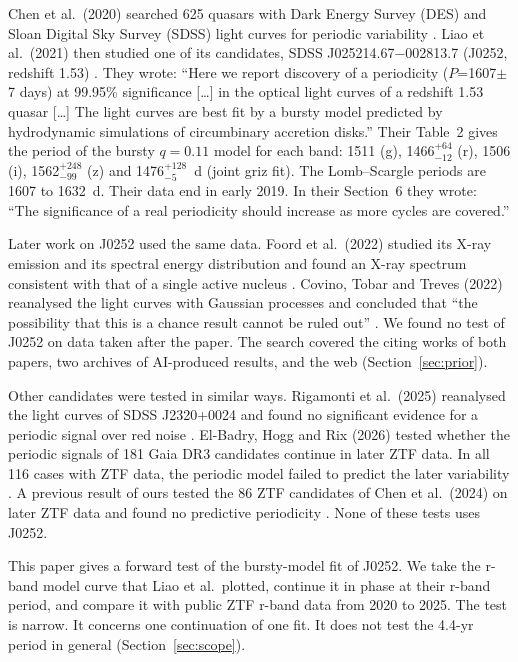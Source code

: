 \documentclass[11pt]{article}
\begin{document}
Chen et al.\ (2020) searched 625 quasars with Dark Energy Survey (DES) and Sloan Digital Sky Survey (SDSS) light curves for periodic variability \cite{chen2020}. Liao et al.\ (2021) then studied one of its candidates, SDSS J025214.67$-$002813.7 (J0252, redshift 1.53) \cite{liao2021}. They wrote: ``Here we report discovery of a periodicity ($P$=1607$\pm$7 days) at 99.95\% significance [\dots] in the optical light curves of a redshift 1.53 quasar [\dots] The light curves are best fit by a bursty model predicted by hydrodynamic simulations of circumbinary accretion disks.'' Their Table~2 gives the period of the bursty $q=0.11$ model for each band: 1511 (g), 1466$^{+64}_{-12}$ (r), 1506 (i), 1562$^{+248}_{-99}$ (z) and 1476$^{+128}_{-5}$~d (joint griz fit). The Lomb--Scargle periods are 1607 to 1632~d. Their data end in early 2019. In their Section~6 they wrote: ``The significance of a real periodicity should increase as more cycles are covered.''

Later work on J0252 used the same data. Foord et al.\ (2022) studied its X-ray emission and its spectral energy distribution and found an X-ray spectrum consistent with that of a single active nucleus \cite{foord2022}. Covino, Tobar and Treves (2022) reanalysed the light curves with Gaussian processes and concluded that ``the possibility that this is a chance result cannot be ruled out'' \cite{covino2022}. We found no test of J0252 on data taken after the paper. The search covered the citing works of both papers, two archives of AI-produced results, and the web (Section~\ref{sec:prior}).

Other candidates were tested in similar ways. Rigamonti et al.\ (2025) reanalysed the light curves of SDSS J2320+0024 and found no significant evidence for a periodic signal over red noise \cite{rigamonti2025}. El-Badry, Hogg and Rix (2026) tested whether the periodic signals of 181 Gaia DR3 candidates continue in later ZTF data. In all 116 cases with ZTF data, the periodic model failed to predict the later variability \cite{elbadry2026}. A previous result of ours tested the 86 ZTF candidates of Chen et al.\ (2024) \cite{chen2024} on later ZTF data and found no predictive periodicity \cite{wu2026}. None of these tests uses J0252.

This paper gives a forward test of the bursty-model fit of J0252. We take the r-band model curve that Liao et al.\ plotted, continue it in phase at their r-band period, and compare it with public ZTF r-band data from 2020 to 2025. The test is narrow. It concerns one continuation of one fit. It does not test the 4.4-yr period in general (Section~\ref{sec:scope}).
\end{document}
